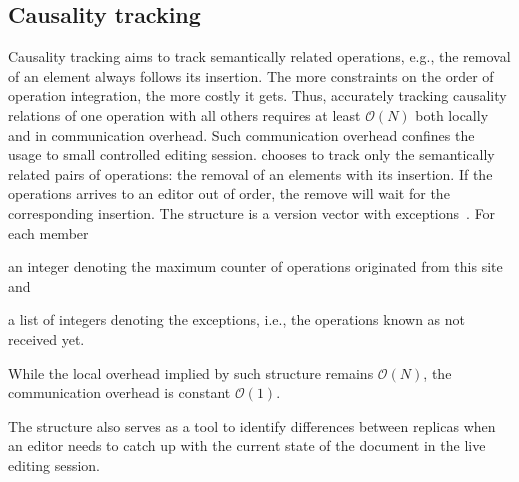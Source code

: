 

\subsection{Causality tracking}
\label{subsec:causality}

Causality tracking aims to track semantically related operations, e.g., the
removal of an element always follows its insertion. The more constraints on the
order of operation integration, the more costly it gets. Thus, accurately
tracking causality relations of one operation with all others requires at least
$\mathcal{O}(N)$ both locally and in communication overhead. Such communication
overhead confines the usage to small controlled editing session. \CRATE chooses
to track only the semantically related pairs of operations: the removal of an
elements with its insertion. If the operations arrives to an editor out of
order, the remove will wait for the corresponding insertion. The structure is a
version vector with exceptions~\cite{malkhi2007concise,
  mukund2014optimized}. For each member
\begin{inparaenum}[(i)]
\item an integer denoting the maximum counter of operations originated from
  this site and
\item a list of integers denoting the exceptions, i.e., the operations known
  as not received yet.
\end{inparaenum}
While the local overhead implied by such structure remains $\mathcal{O}(N)$, the
communication overhead is constant $\mathcal{O}(1)$.

The structure also serves as a tool to identify differences between replicas
when an editor needs to catch up with the current state of the document in the
live editing session.



